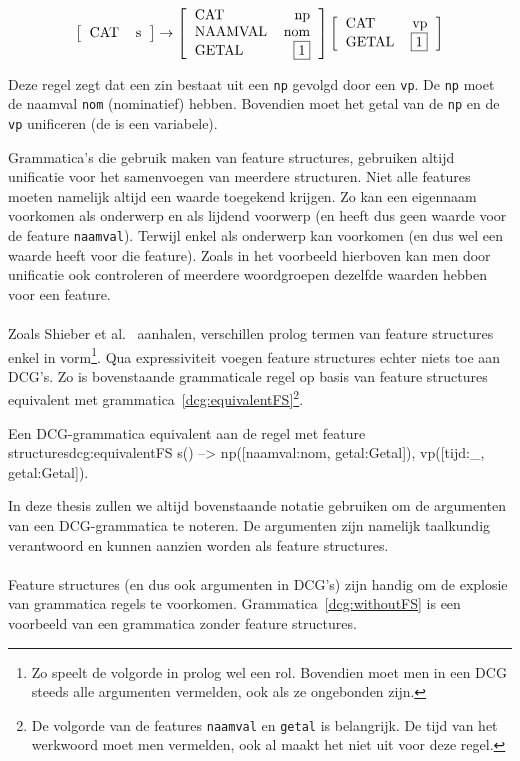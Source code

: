 \[
  \fstructure{
    \feature{CAT}{s}
  }
  \rightarrow
  \fstructure{
    \feature{CAT}{np}
    \feature{NAAMVAL}{nom}
    \feature{GETAL}{\fvariable{1}}
  }
  \fstructure{
    \feature{CAT}{vp}
    \feature{GETAL}{\fvariable{1}}
  }
\]

Deze regel zegt dat een zin bestaat uit een \texttt{np} gevolgd door een \texttt{vp}. De \texttt{np} moet de naamval \texttt{nom} (nominatief) hebben. Bovendien moet het getal van de \texttt{np} en de \texttt{vp} unificeren (de  is een variabele).

Grammatica's die gebruik maken van feature structures, gebruiken altijd unificatie voor het samenvoegen van meerdere structuren. Niet alle features moeten namelijk altijd een waarde toegekend krijgen. Zo kan een eigennaam voorkomen als onderwerp en als lijdend voorwerp (en heeft dus geen waarde voor de feature \texttt{naamval}). Terwijl  enkel als onderwerp kan voorkomen (en dus wel een waarde heeft voor die feature). Zoals in het voorbeeld hierboven kan men door unificatie ook controleren of meerdere woordgroepen dezelfde waarden hebben voor een feature.

\paragraph{} Zoals Shieber et al.\ \cite{Shieber2003} aanhalen, verschillen prolog termen van feature structures enkel in vorm\footnote{Zo speelt de volgorde in prolog wel een rol. Bovendien moet men in een DCG steeds alle argumenten vermelden, ook als ze ongebonden zijn.}. Qua expressiviteit voegen feature structures echter niets toe aan DCG's. Zo is bovenstaande grammaticale regel op basis van feature structures equivalent met grammatica~\ref{dcg:equivalentFS}\footnote{De volgorde van de features \texttt{naamval} en \texttt{getal} is belangrijk. De tijd van het werkwoord moet men vermelden, ook al maakt het niet uit voor deze regel.}.

\begin{dcg}{Een DCG-grammatica equivalent aan de regel met feature structures}{dcg:equivalentFS}
s() --> np([naamval:nom, getal:Getal]), vp([tijd:_, getal:Getal]).
\end{dcg}

In deze thesis zullen we altijd bovenstaande notatie gebruiken om de argumenten van een DCG-grammatica te noteren. De argumenten zijn namelijk taalkundig verantwoord en kunnen aanzien worden als feature structures.

\paragraph{} Feature structures (en dus ook argumenten in DCG's) zijn handig om de explosie van grammatica regels te voorkomen. Grammatica~\ref{dcg:withoutFS} is een voorbeeld van een grammatica zonder feature structures.

